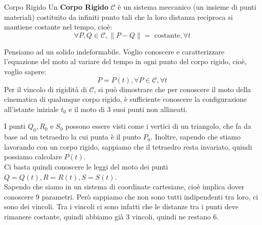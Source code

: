 \documentclass[11pt,a4paper,twoside]{article}
\theoremstyle{definition}
\begin{document}
\begin{defn}{Corpo Rigido}{}
	Un \textbf{Corpo Rigido} $\mathscr C$ è un sistema meccanico (un insieme di punti materiali) costituito da infiniti punto tali che la loro distanza reciproca si mantiene costante nel tempo, cioè:
	\[\forall P, Q \in \mathscr C, \|P-Q\| = \text{ costante}, \forall t\]
\end{defn}

Pensiamo ad un solido indeformabile. Voglio conoscere e caratterizzare l'equazione del moto al variare del tempo in ogni punto del corpo rigido, cioè, voglio sapere:
\[ P = P(t), \forall P \in \mathscr C, \forall t \]
Per il vincolo di rigidità di $\mathscr C$, si può dimostrare che per conoscere il moto della cinematica di qualunque corpo rigido, è sufficiente conoscere la configurazione all'istante iniziale $t_0$ e il moto di $3$ suoi punti non allineati.

\begin{center}
\end{center}

I punti $Q_0, R_0$ e $S_0$ possono essere visti come i vertici di un triangolo, che fa da base ad un tetraedro la cui punta è il punto $P_0$. Inoltre, sapendo che stiamo lavorando con un corpo rigido, sappiamo che il tetraedro resta invariato, quindi possiamo calcolare $P(t)$.\\
Ci basta quindi conoscere le leggi del moto dei punti $Q = Q(t), R=R(t), S=S(t)$.\\
Sapendo che siamo in un sistema di coordinate cartesiane, cioè implica dover conoscere $9$ parametri. Però sappiamo che non sono tutti indipendenti tra loro, ci sono dei vincoli. Tra i vincoli ci sono infatti che le distanze tra i punti deve rimanere costante, quindi abbiamo già $3$ vincoli, quindi ne restano $6$.
\end{document}
